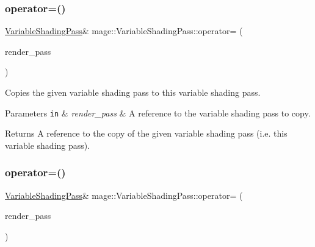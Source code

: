 \subsubsection{\texorpdfstring{operator=()}{operator=()}\hspace{0.1cm}{\footnotesize\ttfamily [1/2]}}
{\footnotesize\ttfamily \hyperlink{classmage_1_1_variable_shading_pass}{Variable\+Shading\+Pass}\& mage\+::\+Variable\+Shading\+Pass\+::operator= (\begin{DoxyParamCaption}\item[{const \hyperlink{classmage_1_1_variable_shading_pass}{Variable\+Shading\+Pass} \&}]{render\+\_\+pass }\end{DoxyParamCaption})\hspace{0.3cm}{\ttfamily [delete]}}

Copies the given variable shading pass to this variable shading pass.


\begin{DoxyParams}[1]{Parameters}
\mbox{\tt in}  & {\em render\+\_\+pass} & A reference to the variable shading pass to copy. \\
\hline
\end{DoxyParams}
\begin{DoxyReturn}{Returns}
A reference to the copy of the given variable shading pass (i.\+e. this variable shading pass). 
\end{DoxyReturn}
\hypertarget{classmage_1_1_variable_shading_pass_a28702f255ccbbabd4b6e3177acd97a8b}{}\label{classmage_1_1_variable_shading_pass_a28702f255ccbbabd4b6e3177acd97a8b} 
\subsubsection{\texorpdfstring{operator=()}{operator=()}\hspace{0.1cm}{\footnotesize\ttfamily [2/2]}}
{\footnotesize\ttfamily \hyperlink{classmage_1_1_variable_shading_pass}{Variable\+Shading\+Pass}\& mage\+::\+Variable\+Shading\+Pass\+::operator= (\begin{DoxyParamCaption}\item[{\hyperlink{classmage_1_1_variable_shading_pass}{Variable\+Shading\+Pass} \&\&}]{render\+\_\+pass }\end{DoxyParamCaption})\hspace{0.3cm}{\ttfamily [delete]}}

